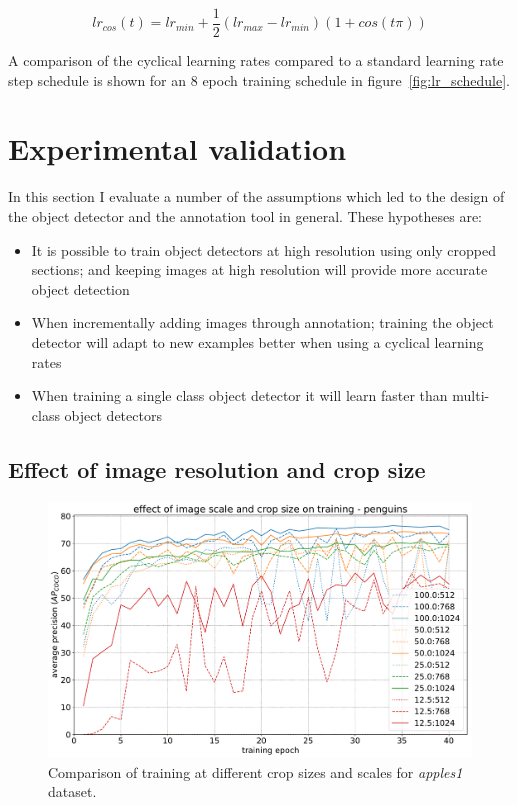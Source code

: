 \begin{equation}
lr_{cos}(t) = lr_{min} +  \frac{1}{2} (lr_{max} - lr_{min}) (1 + cos (t \pi))
\label{eq:cosine_annealing}
\end{equation}

A comparison of the cyclical learning rates compared to a standard learning rate step schedule is shown for an $8$ epoch training schedule in figure~\ref{fig:lr_schedule}.

\section {Experimental validation}

In this section I evaluate a number of the assumptions which led to the design of the object detector and the annotation tool in general. These hypotheses are:

\begin{itemize}
    \item {It is possible to train object detectors at high resolution using only cropped sections; and keeping images at high resolution will provide more accurate object detection}
    \item {When incrementally adding images through annotation; training the object detector will adapt to new examples better when using a cyclical learning rates}    
    \item {When training a single class object detector it will learn faster than multi-class object detectors}
\end{itemize} 


\subsection {Effect of image resolution and crop size}
\label{sec:scale_crop}


\begin{figure}[h]
  \centering
  \includegraphics[width=1.0\linewidth]{charts/training/crops_scales/penguins.pdf}
  \caption{Comparison of training at different crop sizes and scales for \emph{apples1} dataset. }  
  \label{fig:apples_crop_scale}
\end{figure}

